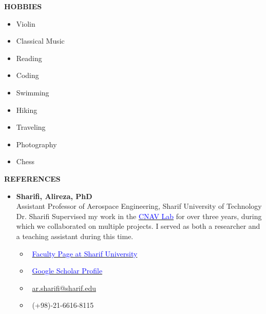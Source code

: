 \documentclass[12pt]{article}
\begin{document}
\begin{center}
	{\noindent \bfseries HOBBIES}
\end{center}
\begin{multicols}{3}
\begin{itemize} \itemsep -4pt
    \item Violin \faMusic
    \item Classical Music  \faHeadphones
    \item Reading  \faBook
    \item Coding  \faLaptopCode
    \item Swimming \faSwimmer
    \item Hiking \faMountain
    \item Traveling \faPlane
    \item Photography \faCamera
    \item Chess \faChess
\end{itemize}
\end{multicols}



\vspace{0.2in} %


\newpage
\begin{center}
	{\noindent \bfseries REFERENCES}
\end{center}
\begin{itemize}
	\item \textbf{Sharifi, Alireza, PhD} \\
	Assistant Professor of Aerospace Engineering, Sharif University of Technology \\
Dr. Sharifi Supervised my work in the \href{https://www.linkedin.com/company/cnav-lab/}{\textcolor{blue}{CNAV Lab}} for over three years, during which we collaborated on multiple projects.
I served as both a researcher and a teaching assistant during this time.
	\begin{multicols}{2}
		\begin{itemize}
			\item \faGlobe \ \href{https://ae.sharif.edu/~portal/faculty/1730782165}{\textcolor{blue}{Faculty Page at Sharif University}}
			\item \faGraduationCap \ \href{https://scholar.google.com/citations?user=k_OdlNMAAAAJ&hl=en}{\textcolor{blue}{Google Scholar Profile}}
			\item \faEnvelope \ \href{mailto:ar.sharifi@sharif.edu}{ar.sharifi@sharif.edu}
			\item \faPhone \ (+98)-21-6616-8115
		\end{itemize}
\end{multicols}
\end{itemize}
\end{document}
